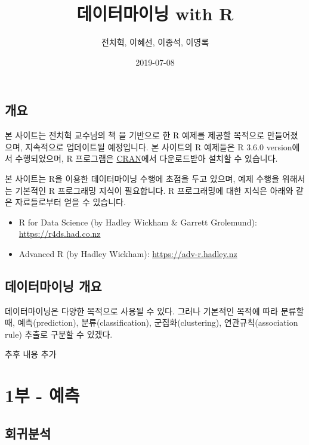 \documentclass[]{book}
\title{데이터마이닝 with R}
\author{전치혁, 이혜선, 이종석, 이영록}
\date{2019-07-08}
\providecommand{\tightlist}{%
  \setlength{\itemsep}{0pt}\setlength{\parskip}{0pt}}
\begin{document}
\maketitle

{
\setcounter{tocdepth}{1}
\tableofcontents
}
\chapter*{개요}

본 사이트는 전치혁 교수님의 책 \href{http://www.hannarae.net/books/area.php?ptype=view\&prdcode=1409250010}{}을 기반으로 한 R 예제를 제공할 목적으로 만들어졌으며, 지속적으로 업데이트될 예정입니다. 본 사이트의 R 예제들은 R 3.6.0 version에서 수행되었으며, R 프로그램은 \href{https://cran.r-project.org}{CRAN}에서 다운로드받아 설치할 수 있습니다.

본 사이트는 R을 이용한 데이터마이닝 수행에 초점을 두고 있으며, 예제 수행을 위해서는 기본적인 R 프로그래밍 지식이 필요합니다. R 프로그래밍에 대한 지식은 아래와 같은 자료들로부터 얻을 수 있습니다.

\begin{itemize}
\tightlist
\item
  R for Data Science (by Hadley Wickham \& Garrett Grolemund): \url{https://r4ds.had.co.nz}
\item
  Advanced R (by Hadley Wickham): \url{https://adv-r.hadley.nz}
\end{itemize}

\hypertarget{datamining-overview}{%
\chapter{데이터마이닝 개요}\label{datamining-overview}}

데이터마이닝은 다양한 목적으로 사용될 수 있다. 그러나 기본적인 목적에 따라 분류할 때, 예측(prediction), 분류(classification), 군집화(clustering), 연관규칙(association rule) 추출로 구분할 수 있겠다.

추후 내용 추가

\hypertarget{part-1---}{%
\part{1부 - 예측}\label{part-1---}}

\hypertarget{regression}{%
\chapter{회귀분석}\label{regression}}
\end{document}
